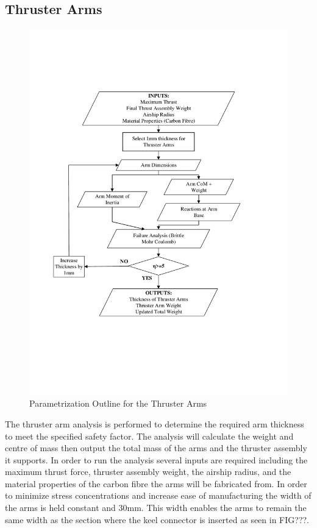\documentclass[../main.tex]{subfiles}
\begin{document}
\subsection{Thruster Arms} \label{thrustArms}

\begin{figure}[H]
	\centering
	\includegraphics[width=.9\linewidth]{img/paramaterization/thrusterArms.pdf}
	\caption{Parametrization Outline for the Thruster Arms}
	\label{fig:thrusterArmsParametrization}
\end{figure}

The thruster arm analysis is performed to determine the required arm thickness to meet the specified safety factor. The analysis will calculate the weight and centre of mass then output the total mass of the arms and the thruster assembly it supports. In order to run the analysis several inputs are required including the maximum thrust force, thruster assembly weight, the airship radius, and the material properties of the carbon fibre the arms will be fabricated from. In order to minimize stress concentrations and increase ease of manufacturing the width of the arms is held constant and 30mm. This width enables the arms to remain the same width as the section where the keel connector is inserted as seen in FIG???. \\
\end{document}
